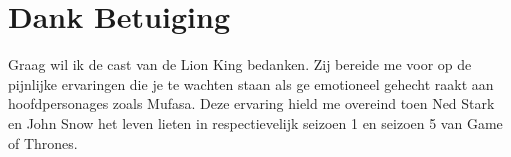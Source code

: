 \section {Dank Betuiging}



Graag wil ik de cast van de Lion King bedanken. Zij bereide me voor op de pijnlijke
ervaringen die je te wachten staan als ge emotioneel gehecht raakt aan hoofdpersonages
zoals Mufasa. Deze ervaring hield me overeind toen Ned Stark en John Snow het leven lieten
in respectievelijk seizoen 1 en seizoen 5 van Game of Thrones.
